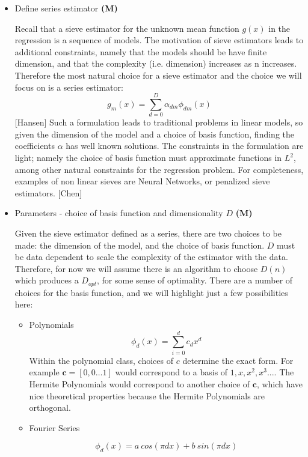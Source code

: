 \documentclass[12pt]{article}  %
\begin{document}
\begin{itemize}
\item Define series estimator \textbf{(M)}

Recall that a sieve estimator for the unknown mean function $g(x)$ in the regression is a sequence of models. The motivation of sieve estimators leads to additional constraints, namely that the models should be have finite dimension, and that the complexity (i.e. dimension) increases as n increases.  Therefore the most natural choice for a sieve estimator and the choice we will focus on is a series estimator: 
$$ g_m(x) = \sum_{d=0}^{D} \alpha_{dm} \phi_{dm}(x)$$  [Hansen]
Such a formulation leads to traditional problems in linear models, so given the dimension of  the model and a choice of basis function, finding the coefficients $\alpha$ has well known solutions.  The constraints in the formulation are light; namely the choice of basis function must approximate functions in $L^2$, among other natural constraints for the regression problem.  For completeness, examples of non linear sieves are Neural Networks, or penalized sieve estimators.  [Chen]



\item Parameters - choice of basis function and dimensionality $D$ \textbf{(M)}

Given the sieve estimator defined as a series, there are two choices to be made: the dimension of the model, and the choice of basis function.  $D$ must be data dependent to scale the complexity of the estimator with the data. Therefore, for now we will assume there is an algorithm to choose $D(n)$ which produces a $D_{opt}$, for some sense of optimality. There are a number of choices for the basis function, and we will highlight just a few possibilities here: 

\begin{itemize}
\item Polynomials $$ \phi_d(x) = \sum_{i=0}^{d} c_d x^d$$
Within the polynomial class, choices of $c$ determine the exact form. For example $\textbf{c} = [0,0 \ldots 1]$ would correspond to a basis of $1,x,x^2,x^3...$. The Hermite Polynomials would correspond to another choice of $\textbf{c}$, which have nice theoretical properties because the Hermite Polynomials are orthogonal.

\item Fourier Series

$$ \phi_d(x) = a~cos(\pi d x) + b~sin(\pi d x)$$


\end{itemize}
\end{itemize}
\end{document}
